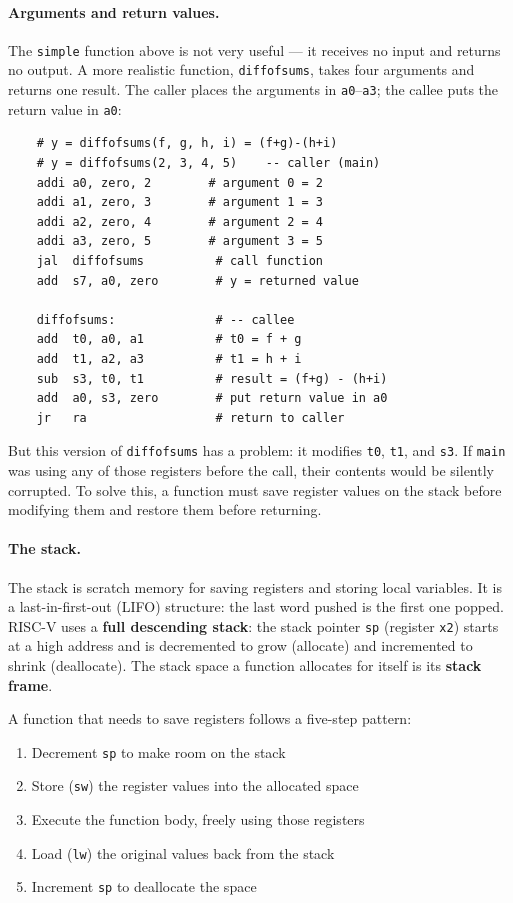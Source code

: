 \documentclass[9pt, a4paper]{extarticle}
\begin{document}
\paragraph{Arguments and return values.} The \texttt{simple} function above is not very useful --- it receives no input and returns no output. A more realistic function, \texttt{diffofsums}, takes four arguments and returns one result. The caller places the arguments in \texttt{a0}--\texttt{a3}; the callee puts the return value in \texttt{a0}:

\begin{verbatim}
    # y = diffofsums(f, g, h, i) = (f+g)-(h+i)
    # y = diffofsums(2, 3, 4, 5)    -- caller (main)
    addi a0, zero, 2        # argument 0 = 2
    addi a1, zero, 3        # argument 1 = 3
    addi a2, zero, 4        # argument 2 = 4
    addi a3, zero, 5        # argument 3 = 5
    jal  diffofsums          # call function
    add  s7, a0, zero        # y = returned value

    diffofsums:              # -- callee
    add  t0, a0, a1          # t0 = f + g
    add  t1, a2, a3          # t1 = h + i
    sub  s3, t0, t1          # result = (f+g) - (h+i)
    add  a0, s3, zero        # put return value in a0
    jr   ra                  # return to caller
\end{verbatim}

But this version of \texttt{diffofsums} has a problem: it modifies \texttt{t0}, \texttt{t1}, and \texttt{s3}. If \texttt{main} was using any of those registers before the call, their contents would be silently corrupted. To solve this, a function must save register values on the stack before modifying them and restore them before returning.

\paragraph{The stack.} The stack is scratch memory for saving registers and storing local variables. It is a last-in-first-out (LIFO) structure: the last word pushed is the first one popped. RISC-V uses a \textbf{full descending stack}: the stack pointer \texttt{sp} (register \texttt{x2}) starts at a high address and is decremented to grow (allocate) and incremented to shrink (deallocate). The stack space a function allocates for itself is its \textbf{stack frame}.

A function that needs to save registers follows a five-step pattern:

\begin{enumerate}
    \item Decrement \texttt{sp} to make room on the stack
    \item Store (\texttt{sw}) the register values into the allocated space
    \item Execute the function body, freely using those registers
    \item Load (\texttt{lw}) the original values back from the stack
    \item Increment \texttt{sp} to deallocate the space
\end{enumerate}
\end{document}
